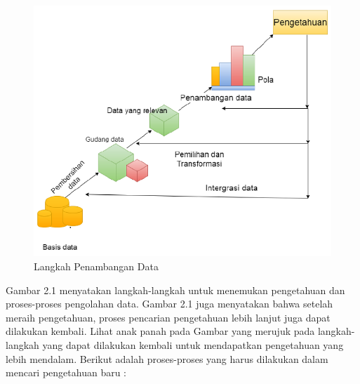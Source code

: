 \begin{figure}[h]
	\centering
	\includegraphics[scale=0.7]{GambarIO/langkah-data-mining}
	\caption[Langkah Penambangan Data]{Langkah Penambangan Data}
	\label{fig:Langkah Penambangan Data}
\end{figure}

Gambar 2.1 menyatakan langkah-langkah untuk menemukan pengetahuan dan proses-proses pengolahan data. Gambar 2.1 juga menyatakan bahwa setelah meraih pengetahuan, proses pencarian pengetahuan lebih lanjut juga dapat dilakukan kembali. Lihat anak panah pada Gambar yang merujuk pada langkah-langkah yang dapat dilakukan kembali untuk mendapatkan pengetahuan yang lebih mendalam. Berikut adalah proses-proses yang harus dilakukan dalam mencari pengetahuan baru \cite{DataMiningIntro:2015}:


